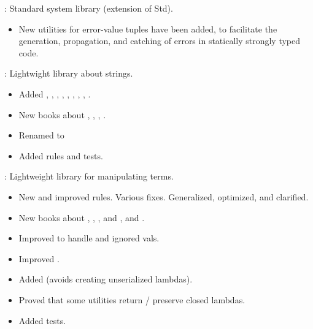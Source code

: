 \begin{frame}

\implibtitle

:
Standard system library (extension of Std).
\begin{itemize}
\item New utilities for error-value tuples have been added,
      to facilitate the generation, propagation, and catching of errors
      in statically strongly typed code.
\end{itemize}

\end{frame}


\begin{frame}

\implibtitle

:
Lightwight library about strings.
\begin{itemize}
\item Added , ,
  , ,
  , ,
  ,
  , .
\item New books about , , , .
\item Renamed  to 
\item Added rules and tests.
\end{itemize}

\end{frame}


\begin{frame}

\implibtitle

:
Lightweight library for manipulating terms.
\begin{itemize}
\item New and improved rules. Various fixes. Generalized, optimized, and clarified.
\item New books about , , , and , and .
\item Improved  to handle  and ignored vals.
\item Improved .
\item Added  (avoids creating unserialized lambdas).
\item Proved that some utilities return / preserve closed lambdas.
\item Added tests.
\end{itemize}

\end{frame}

